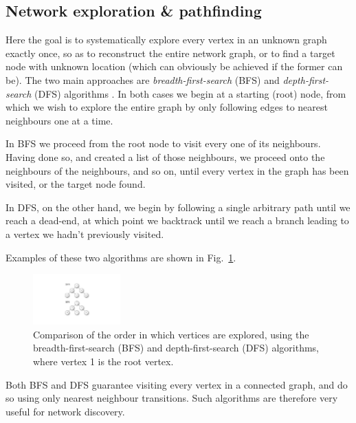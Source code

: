\renewcommand{\tablename}{ALG.}

%
%

\subsection{Network exploration \& pathfinding} \label{sec:path_exp} 

Here the goal is to systematically explore every vertex in an unknown graph exactly once, so as to reconstruct the entire network graph, or to find a target node with unknown location (which can obviously be achieved if the former can be). The two main approaches are \textit{breadth-first-search} (BFS) and \textit{depth-first-search} (DFS) algorithms . In both cases we begin at a starting (root) node, from which we wish to explore the entire graph by only following edges to nearest neighbours one at a time.

In BFS we proceed from the root node to visit every one of its neighbours. Having done so, and created a list of those neighbours, we proceed onto the neighbours of the neighbours, and so on, until every vertex in the graph has been visited, or the target node found.

In DFS, on the other hand, we begin by following a single arbitrary path until we reach a dead-end, at which point we backtrack until we reach a branch leading to a vertex we hadn't previously visited.

Examples of these two algorithms are shown in Fig.~\ref{fig:BFS_DFS}.

\begin{figure}[!htb]
\includegraphics[width=0.3\textwidth]{BFS_DFS}
\caption{Comparison of the order in which vertices are explored, using the breadth-first-search (BFS) and depth-first-search (DFS) algorithms, where vertex 1 is the root vertex.} \label{fig:BFS_DFS}
\end{figure}

Both BFS and DFS guarantee visiting every vertex in a connected graph, and do so using only nearest neighbour transitions. Such algorithms are therefore very useful for network discovery.

